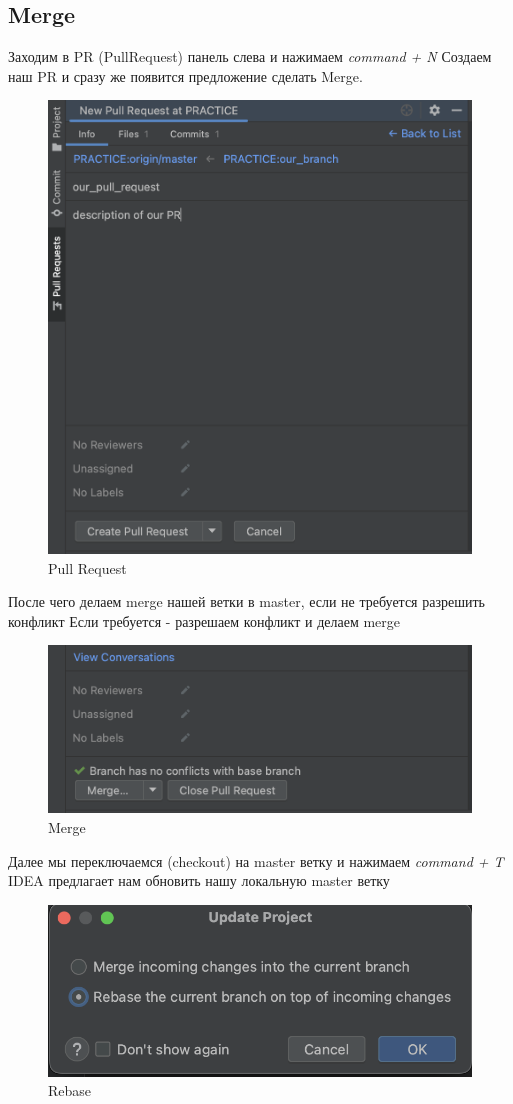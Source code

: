 \documentclass[12pt, a4paper]{article}
\begin{document}
    \subsection{Merge}

    Заходим в PR (PullRequest) панель слева и нажимаем \textit{command + N}
    Создаем наш PR и сразу же появится предложение сделать Merge.

    \begin{figure}[H]
        \centering
        \includegraphics[width=0.55\linewidth]{src/PR.png}
        \caption{Pull Request}
    \end{figure}

    После чего делаем merge нашей ветки в master, если не требуется разрешить конфликт
    Если требуется - разрешаем конфликт и делаем merge
    
    \begin{figure}[H]
        \centering
        \includegraphics[width=0.75\linewidth]{src/merge.png}
        \caption{Merge}
    \end{figure}

    Далее мы переключаемся (checkout) на master ветку и нажимаем \textit{command + T}
    IDEA предлагает нам обновить нашу локальную master ветку

    \begin{figure}[H]
        \centering
        \includegraphics[width=0.75\linewidth]{src/rebase.png}
        \caption{Rebase}
    \end{figure}
\end{document}

